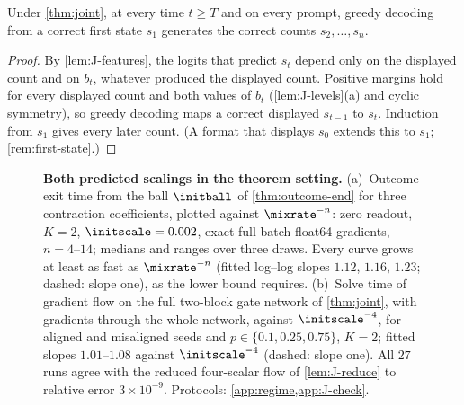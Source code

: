 \begin{corollary}
\label{cor:free-running}
Under \cref{thm:joint}, at every time $t\ge T$ and on every prompt, greedy decoding from a correct first state $s_1$ generates the correct
counts $s_2,\ldots,s_n$.
\end{corollary}
\begin{proof}
By \cref{lem:J-features}, the logits that predict $s_t$ depend only on the displayed count and on $b_t$, whatever produced the displayed
count. Positive margins hold for every displayed count and both values of $b_t$ (\cref{lem:J-levels}(a) and cyclic symmetry), so greedy
decoding maps a correct displayed $s_{t-1}$ to $s_t$. Induction from $s_1$ gives every later count. (A format that displays $s_0$
extends this to $s_1$; \cref{rem:first-state}.)
\end{proof}

\begin{figure}[t]
\centering
\resizebox{\linewidth}{!}{}
\caption{\textbf{Both predicted scalings in the theorem setting.}
(a)~Outcome exit time from the ball $\initball$ of \cref{thm:outcome-end} for three contraction coefficients, plotted against $\mixrate^{-n}$:
zero readout, $K=2$, $\initscale=0.002$, exact full-batch float64 gradients, $n=4$--$14$; medians and ranges over three draws. Every curve grows at least as fast as $\mixrate^{-n}$
(fitted log--log slopes $1.12$, $1.16$, $1.23$; dashed: slope one), as the lower bound requires. (b)~Solve time of gradient flow on the full two-block gate network of \cref{thm:joint}, with gradients through the whole network,
against $\initscale^{-4}$, for aligned and misaligned seeds and $p\in\{0.1,0.25,0.75\}$, $K=2$; fitted slopes $1.01$--$1.08$ against $\initscale^{-4}$ (dashed: slope one). All $27$ runs
agree with the reduced four-scalar flow of \cref{lem:J-reduce} to relative error $3\times10^{-9}$.
Protocols: \cref{app:regime,app:J-check}.}
\label{fig:scaling}
\end{figure}

\noindent{}

